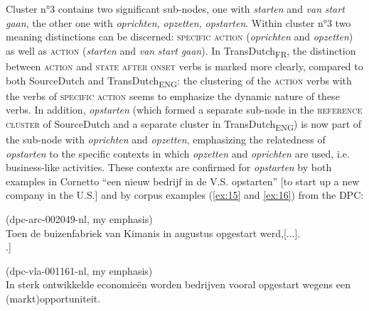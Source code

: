 Cluster n°3 contains two significant sub-nodes, one with \textit{starten} and \textit{van} \textit{start} \textit{gaan}, the other one with \textit{oprichten,} \textit{opzetten,} \textit{opstarten}. Within cluster n°3 two meaning distinctions can be discerned: {\textsc{specific}} \textsc{action} (\textit{oprichten} and \textit{opzetten}) as well as \textsc{action} (\textit{starten} and \textit{van} \textit{start} \textit{gaan}). In TransDutch\textsubscript{FR}, the distinction between \textsc{action} and \textsc{state after onset} verbs is marked more clearly, compared to both SourceDutch and TransDutch\textsubscript{ENG}: the clustering of the \textsc{action} verbs with the verbs of {\textsc{specific}} \textsc{action} seems to emphasize the dynamic nature of these verbs. In addition, \textit{opstarten} (which formed a separate sub-node in the \textsc{reference cluster} of SourceDutch and a separate cluster in TransDutch\textsubscript{ENG}) is now part of the sub-node with \textit{oprichten} and \textit{opzetten}, emphasizing the relatedness of \textit{opstarten} to the specific contexts in which \textit{opzetten} and \textit{oprichten} are used, i.e. business-like activities. These contexts are confirmed for \textit{opstarten} by both examples in Cornetto “een nieuw bedrijf in de V.S. opstarten” [to start up a new company in the U.S.] and by corpus examples (\ref{ex:15} and \ref{ex:16}) from the DPC:

\ea(dpc-arc-002049-nl, my emphasis)\label{ex:15}\\
Toen de buizenfabriek van Kimanis in augustus opgestart werd,[...].\\\relax
[\textsc{target:} When the pipe manufacturing facility in Kimanis was started up in August,[...].]
\z

\ea(dpc-vla-001161-nl, my emphasis)\label{ex:16}\\
In sterk ontwikkelde economieën worden bedrijven vooral opgestart wegens een (markt)opportuniteit.\\ 
\z

